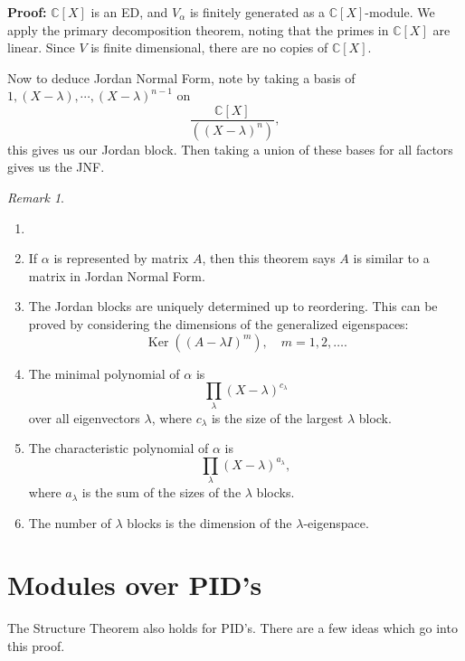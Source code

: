 \documentclass[12pt]{article}
\DeclareMathOperator{\Ker}{Ker}
\theoremstyle{definition}
\theoremstyle{remark}
\newtheorem*{remark}{Remark}
\begin{document}
\begin{adjustbox}{minipage = \columnwidth - 25.5pt, margin=1em, frame=1pt, margin=0em}
	\textbf{Proof:} $\mathbb{C}[X]$ is an ED, and $V_{\alpha}$ is finitely generated as a $\mathbb{C}[X]$-module. We apply the primary decomposition theorem, noting that the primes in $\mathbb{C}[X]$ are linear. Since $V$ is finite dimensional, there are no copies of $\mathbb{C}[X]$.

	Now to deduce Jordan Normal Form, note by taking a basis of $1, (X - \lambda), \cdots, (X - \lambda)^{n-1}$ on
	\[
		\frac{\mathbb{C}[X]}{((X - \lambda)^{n})}
	,\]
	this gives us our Jordan block. Then taking a union of these bases for all factors gives us the JNF.
\end{adjustbox}

\begin{remark}
	\begin{enumerate}[label = (\roman*)]
		\item[]
		\item If $\alpha$ is represented by matrix $A$, then this theorem says $A$ is similar to a matrix in Jordan Normal Form.
		\item The Jordan blocks are uniquely determined up to reordering. This can be proved by considering the dimensions of the generalized eigenspaces:
			\[
				\Ker ((A - \lambda I)^{m}), \quad m = 1, 2, \ldots
			.\]
		\item The minimal polynomial of $\alpha$ is
			\[
				\prod_{\lambda} (X - \lambda)^{c_{\lambda}}
			\]
			over all eigenvectors $\lambda$, where $c_{\lambda}$ is the size of the largest $\lambda$ block.
		\item The characteristic polynomial of $\alpha$ is
			\[
				\prod_{\lambda} (X - \lambda)^{a_{\lambda}}
			,\]
			where $a_{\lambda}$ is the sum of the sizes of the $\lambda$ blocks.
		\item The number of $\lambda$ blocks is the dimension of the $\lambda$-eigenspace.
	\end{enumerate}
\end{remark}

\newpage

\section{Modules over PID's}%
\label{sec:modules_over_pid_s}

The Structure Theorem also holds for PID's. There are a few ideas which go into this proof.
\end{document}
